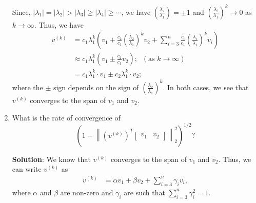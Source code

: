 \documentclass[11pt,onecolumn]{article}
\begin{document}
\begin{enumerate}[label=(\alph*)]
          Since, $\lvert\lambda_1\rvert = \lvert\lambda_2\rvert > \lvert \lambda_3\rvert \geq \lvert\lambda_4\rvert \geq \cdots$, we have $\left(\frac{\lambda_2}{\lambda_1}\right) = \pm 1$ and $\left(\frac{\lambda_i}{\lambda_1}\right)^k \to 0$ as $k\to\infty$.
          Thus, we have
          \begin{align*}
              v^{(k)} & = c_1\lambda_1^k\left(v_1 + \frac{c_2}{c_1}\left(\frac{\lambda_2}{\lambda_1}\right)^kv_2 + \sum_{i=3}^{n}\frac{c_i}{c_1}\left(\frac{\lambda_i}{\lambda_1}\right)^kv_i\right) \\
                      & \approx c_1\lambda_1^k\left(v_1 \pm \frac{c_2}{c_1}v_2\right);\;\;          (\text{as $k\to \infty$})                                                                        \\
                      & = c_1\lambda_1^k\cdot v_1 \pm c_2\lambda_1^k\cdot v_2;                                                                                                
          \end{align*}
          where the $\pm$ sign depends on the sign of $\left(\frac{\lambda_2}{\lambda_1}\right)^k$. In both cases, we see that $v^{(k)}$ converges to the span of $v_1$ and $v_2$.
    \item What is the rate of convergence of $$\left(1-\left\|\left(v^{(k)}\right)^T\begin{bmatrix}v_1 & v_2\end{bmatrix}\right\|^2_2\right)^{1/2}?$$
          
          \textbf{Solution}:
          We know that $v^{(k)}$ converges to the span of $v_1$ and $v_2$. Thus, we can write $v^{(k)}$ as
          \begin{align*}
              v^{(k)} & = \alpha v_1 + \beta v_2 + \sum_{i=3}^{n}\gamma_iv_i,
          \end{align*}
          where $\alpha$ and $\beta$ are non-zero and $\gamma_i$ are such that $\sum_{i=3}^{n}\gamma_i^2 = 1$.
          

\end{enumerate}
\end{document}
